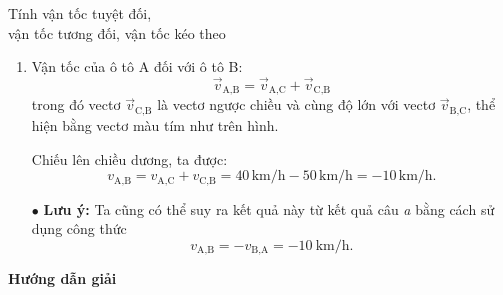 \begin{dang}{Tính vận tốc tuyệt đối,\\ vận tốc tương đối, vận tốc kéo theo}
{\begin{enumerate}[label=\alph*.]
			Chiều dương được chọn là chiều chuyển động của hai ô tô.
			Chiếu lên chiều dương, ta được:
			$$v_{\textrm{B,A}}=v_{\textrm{B,C}}+v_{\textrm{C,A}}= 50\, \textrm{km/h}-40\, \textrm{km/h} = 10\, \textrm{km/h}.$$
			\item Vận tốc của ô tô A đối với ô tô B: 	$$\vec{v}_{\textrm{A,B}}=\vec{v}_{\textrm{A,C}}+\vec{v}_{\textrm{C,B}}$$
			trong đó vectơ $\vec{v}_{\textrm{C,B}}$ là vectơ ngược chiều và cùng độ lớn với vectơ $\vec{v}_{\textrm{B,C}}$, thể hiện bằng vectơ màu tím như trên hình.
			
			Chiếu lên chiều dương, ta được:
			$$v_{\textrm{A,B}}=v_{\textrm{A,C}}+v_{\textrm{C,B}}= 40\, \textrm{km/h}-50\, \textrm{km/h} = -10\, \textrm{km/h}.$$
			
			$\bullet$ \textbf{Lưu ý:} Ta cũng có thể suy ra kết quả này từ kết quả câu \textit{a} bằng cách sử dụng công thức 
			$$v_{\textrm{A,B}}=-v_{\textrm{B,A}}=-\SI{10}{\kilo\meter/\hour}.$$
		\end{enumerate}	
	}
	{	\begin{center}
			\textbf{Hướng dẫn giải}
		\end{center}
		
}
\end{dang}
